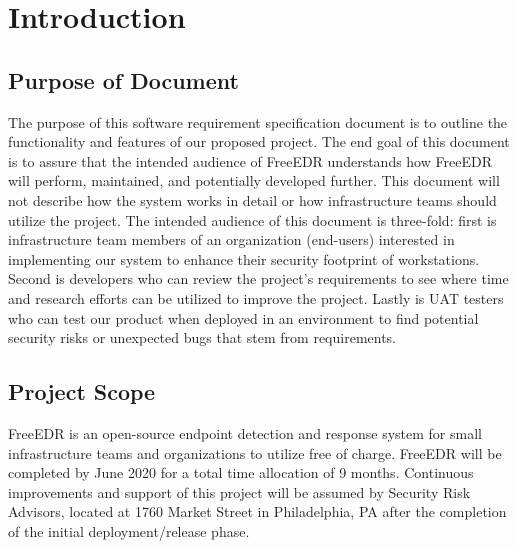 \documentclass{scrreprt}
\begin{document}
\chapter{Introduction}

\section{Purpose of Document}
The purpose of this software requirement specification document is to outline the functionality and features of our proposed project. The end goal of this document is to assure that the intended audience of FreeEDR understands how FreeEDR will perform, maintained, and potentially developed further. This document will not describe how the system works in detail or how infrastructure teams should utilize the project. The intended audience of this document is three-fold: first is infrastructure team members of an organization (end-users) interested in implementing our system to enhance their security footprint of workstations.  Second is developers who can review the project’s requirements to see where time and research efforts can be utilized to improve the project. Lastly is UAT testers who can test our product when deployed in an environment to find potential security risks or unexpected bugs that stem from requirements. 

\section{Project Scope}
FreeEDR is an open-source endpoint detection and response system for small infrastructure teams and organizations to utilize free of charge. FreeEDR will be completed by June 2020 for a total time allocation of 9 months. Continuous improvements and support of this project will be assumed by Security Risk Advisors, located at 1760 Market Street in Philadelphia, PA after the completion of the initial deployment/release phase. 
\end{document}
